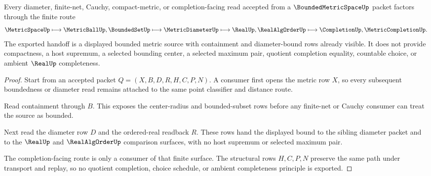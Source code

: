\begin{theorem}
\label{thm:bounded-metric-space-diameter-bound-handoff}
Every diameter, finite-net, Cauchy, compact-metric, or completion-facing read accepted from a $\BoundedMetricSpaceUp$ packet factors through the finite route
$$
\MetricSpaceUp
\longmapsto
\MetricBallUp,\BoundedSetUp
\longmapsto
\MetricDiameterUp
\longmapsto
\RealUp,\RealAlgOrderUp
\longmapsto
\CompletionUp,\MetricCompletionUp .
$$
The exported handoff is a displayed bounded metric source with containment and diameter-bound rows already visible. It does not provide compactness, a host supremum, a selected bounding center, a selected maximum pair, quotient completion equality, countable choice, or ambient $\RealUp$ completeness.
\end{theorem}
\begin{proof}
Start from an accepted packet $Q=(X,B,D,R,H,C,P,N)$. A consumer first opens the metric row $X$, so every subsequent boundedness or diameter read remains attached to the same point classifier and distance route.

Read containment through $B$. This exposes the center-radius and bounded-subset rows before any finite-net or Cauchy consumer can treat the source as bounded.

Next read the diameter row $D$ and the ordered-real readback $R$. These rows hand the displayed bound to the sibling diameter packet and to the $\RealUp$ and $\RealAlgOrderUp$ comparison surfaces, with no host supremum or selected maximum pair.

The completion-facing route is only a consumer of that finite surface. The structural rows $H,C,P,N$ preserve the same path under transport and replay, so no quotient completion, choice schedule, or ambient completeness principle is exported.
\end{proof}


\begin{closurestatus}{\BoundedMetricSpaceUp}
  \theoryclosure{\seedClosure}
  \formalstatus{\unformalizedV}
\end{closurestatus}
